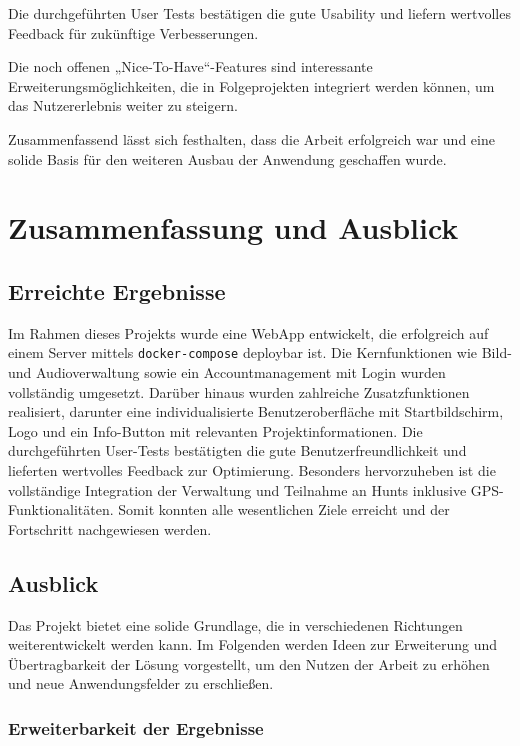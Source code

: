 \documentclass[oneside]{ausarbeitung}
\begin{document}
Die durchgeführten User Tests bestätigen die gute Usability und liefern wertvolles Feedback für zukünftige Verbesserungen. 

Die noch offenen „Nice-To-Have“-Features sind interessante Erweiterungsmöglichkeiten, die in Folgeprojekten integriert werden können, um das Nutzererlebnis weiter zu steigern.  

Zusammenfassend lässt sich festhalten, dass die Arbeit erfolgreich war und eine solide Basis für den weiteren Ausbau der Anwendung geschaffen wurde.

\chapter{Zusammenfassung und Ausblick}
\label{cha:zusammenfassung}

\section{Erreichte Ergebnisse}
\label{sec:ergebnisse}

Im Rahmen dieses Projekts wurde eine WebApp entwickelt, die erfolgreich auf einem Server mittels \texttt{docker-compose} deploybar ist.  
Die Kernfunktionen wie Bild- und Audioverwaltung sowie ein Accountmanagement mit Login wurden vollständig umgesetzt.  
Darüber hinaus wurden zahlreiche Zusatzfunktionen realisiert, darunter eine individualisierte Benutzeroberfläche mit Startbildschirm, Logo und ein Info-Button mit relevanten Projektinformationen.  
Die durchgeführten User-Tests bestätigten die gute Benutzerfreundlichkeit und lieferten wertvolles Feedback zur Optimierung.  
Besonders hervorzuheben ist die vollständige Integration der Verwaltung und Teilnahme an Hunts inklusive GPS-Funktionalitäten.  
Somit konnten alle wesentlichen Ziele erreicht und der Fortschritt nachgewiesen werden.  

\section{Ausblick}
\label{sec:ausblick}

Das Projekt bietet eine solide Grundlage, die in verschiedenen Richtungen weiterentwickelt werden kann.  
Im Folgenden werden Ideen zur Erweiterung und Übertragbarkeit der Lösung vorgestellt, um den Nutzen der Arbeit zu erhöhen und neue Anwendungsfelder zu erschließen.  

\subsection{Erweiterbarkeit der Ergebnisse}
\label{sub:erweiterbarkeit}
\end{document}
